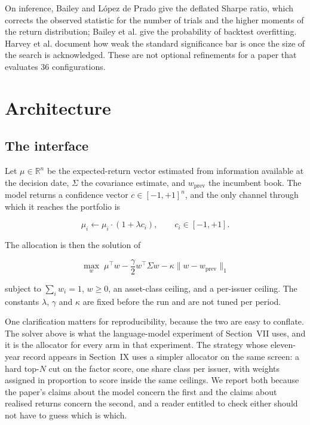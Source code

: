 \documentclass[10pt,conference]{IEEEtran}
\begin{document}
On inference, Bailey and L\'opez de Prado \cite{deflated} give the deflated Sharpe ratio, which corrects the observed statistic for the number of trials and the higher moments of the return distribution; Bailey et al. \cite{pbo} give the probability of backtest overfitting. Harvey et al. \cite{harvey} document how weak the standard significance bar is once the size of the search is acknowledged. These are not optional refinements for a paper that evaluates 36 configurations.

\section{Architecture}

\subsection{The interface}

Let $\mu \in \mathbb{R}^{n}$ be the expected-return vector estimated from information available at the decision date, $\Sigma$ the covariance estimate, and $w_{\text{prev}}$ the incumbent book. The model returns a confidence vector $c \in [-1,+1]^{n}$, and the only channel through which it reaches the portfolio is

\begin{equation}
\mu_i \leftarrow \mu_i \cdot (1 + \lambda c_i), \qquad c_i \in [-1,+1].
\end{equation}

The allocation is then the solution of

\begin{equation}
\max_{w} \; \mu^{\top}w - \frac{\gamma}{2} w^{\top}\Sigma w - \kappa \lVert w - w_{\text{prev}} \rVert_1
\end{equation}

subject to $\sum_i w_i = 1$, $w \ge 0$, an asset-class ceiling, and a per-issuer ceiling. The constants $\lambda$, $\gamma$ and $\kappa$ are fixed before the run and are not tuned per period.

One clarification matters for reproducibility, because the two are easy to conflate. The solver above is what the language-model experiment of Section~VII uses, and it is the allocator for every arm in that experiment. The strategy whose eleven-year record appears in Section~IX uses a simpler allocator on the same screen: a hard top-$N$ cut on the factor score, one share class per issuer, with weights assigned in proportion to score inside the same ceilings. We report both because the paper's claims about the model concern the first and the claims about realised returns concern the second, and a reader entitled to check either should not have to guess which is which.
\end{document}
